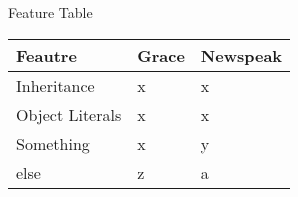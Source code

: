 
\begin{table}[]
\centering
\makebox[\columnwidth][c]{
    
}
\caption{Feature Table}
\label{table:features}
\end{table}


\begin{tabular}{l|ll}
Feautre         & Grace & Newspeak \\ \hline
Inheritance     & x     & x        \\
Object Literals & x     & x        \\
Something       & x     & y        \\
else            & z     & a       
\end{tabular}